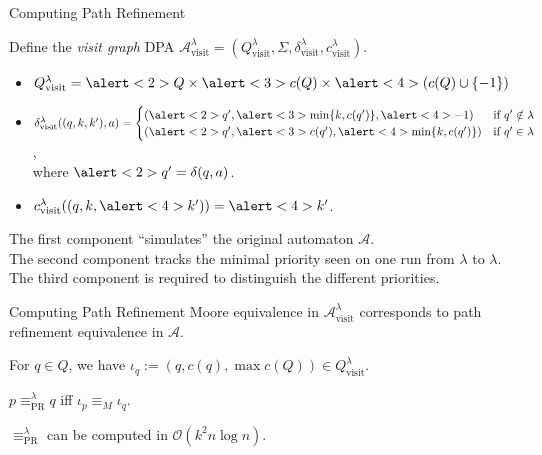 \begin{frame}{Computing Path Refinement}
	\begin{defn}
		Define the \emph{visit graph} DPA $\mathcal{A}_\text{visit}^\lambda = (Q_\text{visit}^\lambda, \Sigma, \delta_\text{visit}^\lambda, c_\text{visit}^\lambda)$.
		\begin{itemize}
			\item $Q_\text{visit}^\lambda = \alert<2>{Q} \times \alert<3>{c(Q)} \times \alert<4>{(c(Q) \cup \{-1\})}$
			\item $\delta^\lambda_\text{visit}((q, k, k'), a) = \begin{cases}
				(\alert<2>{q'}, \alert<3>{\min \{k, c(q')\}}, \alert<4>{-1}) & \text{if } q' \notin \lambda \\
				(\alert<2>{q'}, \alert<3>{c(q')}, \alert<4>{\min \{k, c(q')\}}) & \text{if } q' \in \lambda
			\end{cases}$, \\ where $\alert<2>{q' = \delta(q, a)}$.
			\item $c_\text{visit}^\lambda((q, k, \alert<4>{k'})) = \alert<4>{k'}$.
		\end{itemize}
	\end{defn}
	
	\vspace{.5cm}
	
	The \alert<2>{first} component \enquote{simulates} the original automaton $\mathcal{A}$. \\
	The \alert<3>{second} component tracks the minimal priority seen on one run from $\lambda$ to $\lambda$. \\
	The \alert<4>{third} component is required to distinguish the different priorities.
\end{frame}


\begin{frame}{Computing Path Refinement}
	Moore equivalence in $\mathcal{A}_\text{visit}^\lambda$ corresponds to path refinement equivalence in $\mathcal{A}$.
	
	\begin{defn}
		For $q \in Q$, we have $\iota_q := (q, c(q), \max c(Q)) \in Q_\text{visit}^\lambda$.
	\end{defn}
	
	\begin{theorem}
		$p \equiv_\text{PR}^\lambda q$ iff $\iota_p \equiv_M \iota_q$.
	\end{theorem}
	
	\begin{theorem}
		$\equiv_\text{PR}^\lambda$ can be computed in $\mathcal{O}(k^2 n \log n)$.
	\end{theorem}
\end{frame}


